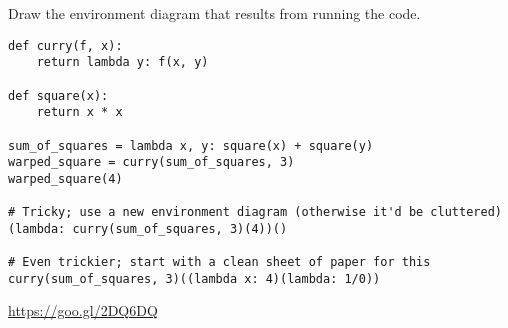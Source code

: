 \begin{blocksection}
\question Draw the environment diagram that results from running the code.

\begin{lstlisting}
def curry(f, x):
    return lambda y: f(x, y)

def square(x):
    return x * x

sum_of_squares = lambda x, y: square(x) + square(y)
warped_square = curry(sum_of_squares, 3)
warped_square(4)

# Tricky; use a new environment diagram (otherwise it'd be cluttered)
(lambda: curry(sum_of_squares, 3)(4))()

# Even trickier; start with a clean sheet of paper for this
curry(sum_of_squares, 3)((lambda x: 4)(lambda: 1/0))
\end{lstlisting}

\begin{solution}
\url{https://goo.gl/2DQ6DQ}
\end{solution}
\end{blocksection}

